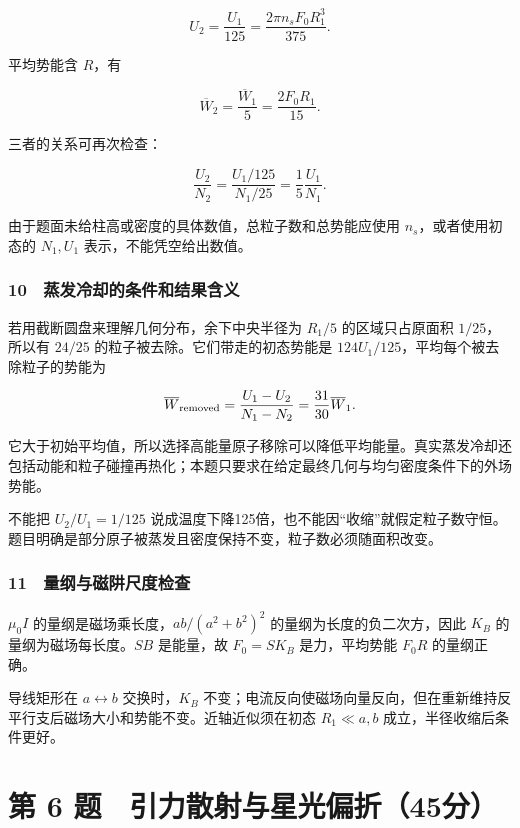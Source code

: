 \documentclass[12pt,a4paper,fontset=fandol]{ctexart}
\begin{document}
\[\boxed{U_2=\frac{U_1}{125}
=\frac{2\pi n_sF_0R_1^3}{375}.}\]

平均势能含 \(R\)，有

\[\boxed{\overline W_2=\frac{\overline W_1}{5}
=\frac{2F_0R_1}{15}.}\]

三者的关系可再次检查：

\[\frac{U_2}{N_2}
=\frac{U_1/125}{N_1/25}
=\frac15\frac{U_1}{N_1}.\]

由于题面未给柱高或密度的具体数值，总粒子数和总势能应使用
\(n_s\)，或者使用初态的 \(N_1,U_1\) 表示，不能凭空给出数值。

\subsubsection{10　蒸发冷却的条件和结果含义}\label{ux84b8ux53d1ux51b7ux5374ux7684ux6761ux4ef6ux548cux7ed3ux679cux542bux4e49}

若用截断圆盘来理解几何分布，余下中央半径为 \(R_1/5\) 的区域只占原面积
\(1/25\)，所以有 \(24/25\) 的粒子被去除。它们带走的初态势能是
\(124U_1/125\)，平均每个被去除粒子的势能为

\[\overline W_{\rm removed}
=\frac{U_1-U_2}{N_1-N_2}
=\frac{31}{30}\overline W_1.\]

它大于初始平均值，所以选择高能量原子移除可以降低平均能量。真实蒸发冷却还包括动能和粒子碰撞再热化；本题只要求在给定最终几何与均匀密度条件下的外场势能。

不能把 \(U_2/U_1=1/125\)
说成温度下降125倍，也不能因``收缩''就假定粒子数守恒。题目明确是部分原子被蒸发且密度保持不变，粒子数必须随面积改变。

\subsubsection{11　量纲与磁阱尺度检查}\label{ux91cfux7eb2ux4e0eux78c1ux9631ux5c3aux5ea6ux68c0ux67e5}

\(\mu_0I\) 的量纲是磁场乘长度，\(ab/(a^2+b^2)^2\)
的量纲为长度的负二次方，因此 \(K_B\) 的量纲为磁场每长度。\(SB\)
是能量，故 \(F_0=SK_B\) 是力，平均势能 \(F_0R\) 的量纲正确。

导线矩形在 \(a\leftrightarrow b\) 交换时，\(K_B\)
不变；电流反向使磁场向量反向，但在重新维持反平行支后磁场大小和势能不变。近轴近似须在初态
\(R_1\ll a,b\) 成立，半径收缩后条件更好。

\clearpage

\section{第 6
题　引力散射与星光偏折（45分）}\label{ux7b2c-6-ux9898-ux5f15ux529bux6563ux5c04ux4e0eux661fux5149ux504fux629845ux5206}
\end{document}
